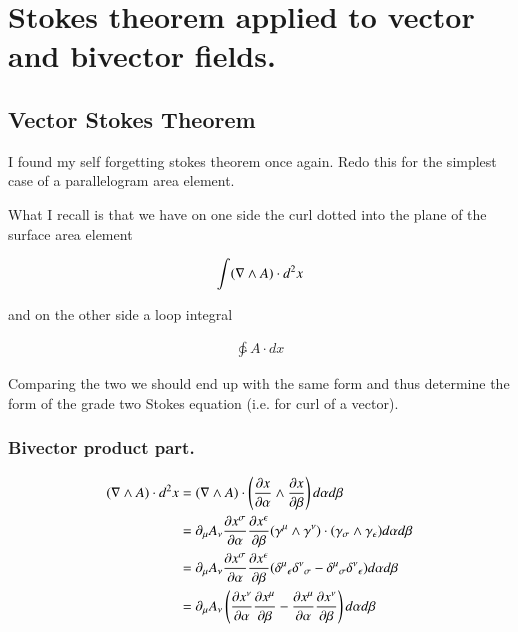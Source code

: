 %

\chapter{Stokes theorem applied to vector and bivector fields.}
\label{chap:stokesGradeTwo}


\date{July 17, 2009.  $RCSfile: stokesGradeTwo.tex,v $ Last $Revision: 1.5 $ $Date: 2009/08/01 22:12:18 $}

\beginArtWithToc

\section{Vector Stokes Theorem}

I found my self forgetting stokes theorem once again.  Redo this for the simplest case of a parallelogram area element.

What I recall is that we have on one side the curl dotted into the plane of the surface area element

\begin{align}
\int ( \nabla \wedge A ) \cdot d^2 x
\end{align}

and on the other side a loop integral

\begin{align}
\ointctrclockwise A \cdot dx
\end{align}

Comparing the two we should end up with the same form and thus determine the form of the grade two Stokes equation (i.e. for curl of a vector).

\subsection{Bivector product part.}

\begin{align*}
( \nabla \wedge A ) \cdot d^2 x 
&=
( \nabla \wedge A ) \cdot \left(\frac{\partial {x}}{\partial {\alpha}} \wedge \frac{\partial {x}}{\partial {\beta}}\right) 
d\alpha d\beta \\
&=
\partial_\mu A_\nu \frac{\partial {x^\sigma}}{\partial {\alpha}} \frac{\partial {x^\epsilon}}{\partial {\beta}} (\gamma^\mu \wedge \gamma^\nu) \cdot (\gamma_\sigma \wedge \gamma_\epsilon) 
d\alpha d\beta \\
&=
\partial_\mu A_\nu \frac{\partial {x^\sigma}}{\partial {\alpha}} \frac{\partial {x^\epsilon}}{\partial {\beta}} ( {\delta^\mu}_\epsilon {\delta^\nu}_\sigma - {\delta^\mu}_\sigma {\delta^\nu}_\epsilon ) 
d\alpha d\beta \\
&=
\partial_\mu A_\nu \left( \frac{\partial {x^\nu}}{\partial {\alpha}} \frac{\partial {x^\mu}}{\partial {\beta}} - \frac{\partial {x^\mu}}{\partial {\alpha}} \frac{\partial {x^\nu}}{\partial {\beta}} \right) 
d\alpha d\beta \\
\end{align*}

